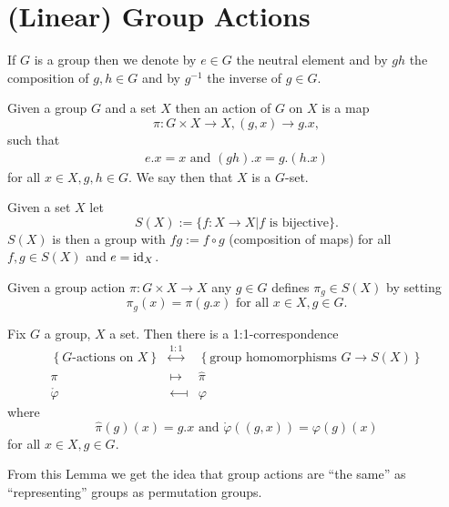 \chapter{(Linear) Group Actions}


If $G$ is a group then we denote by $e \in G$ the neutral element and by $gh$ the composition of $g,h \in G$ and by $g^{-1}$ the inverse of $g \in G$.


\begin{defi}
 Given a group $G$ and a set $X$ then an action of $G$ on $X$ is a map
 \[
  \pi : G \times X \to X, (g,x) \to g.x,
 \]
 such that
 \begin{gather*}
  e.x = x \text{ and }
  (gh).x = g.(h.x)
 \end{gather*}
 for all $x \in X, g,h \in G$. We say then that $X$ is a $G$-set.
\end{defi}


\begin{defi}
 Given a set $X$ let
 \[
  S(X) := \{f : X \to X | f \text{ is bijective}\}.
 \]
 $S(X)$ is then a group with $fg := f \circ g$ (composition of maps) for all $f,g \in S(X)$ and $e = \operatorname{id}_X$.
\end{defi}


Given a group action $\pi : G \times X \to X$ any  $g \in G$ defines $\pi_g \in S(X)$ by setting
\[
 \pi_g(x) = \pi(g.x) \text{ for all } x \in X, g \in G.
\]


\begin{lem}\label{lem: G-actions = group homos G -> S(X)}
 Fix $G$ a group, $X$ a set. Then there is a 1:1-correspondence
 \[
 \begin{matrix}
    \left\{\text{$G$-actions on $X$}\right\}
  & \overset{1:1}{\longleftrightarrow}
  & \left\{\text{group homomorphisms $G \to S(X)$}\right\} \\
    \pi
  & \longmapsto
  & \hat{\pi} \\
    \mathring{\varphi}
  & \longmapsfrom
  & \varphi
  \end{matrix}
 \]
 where
 \[
  \hat{\pi}(g)(x) = g.x \text{ and } \mathring{\varphi}((g,x)) = \varphi(g)(x)
 \]
 for all $x \in X, g \in G$.
\end{lem}


From this Lemma we get the idea that group actions are ``the same'' as ``representing'' groups as permutation groups.


